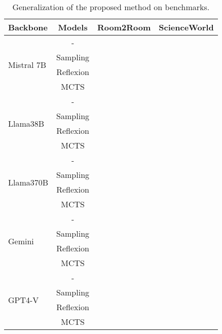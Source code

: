 \begin{table*}[t]
    \centering
    \begin{tabular}{lccc}
    \toprule
    Backbone    & Models & Room2Room & ScienceWorld \\
    \midrule
    \multirow{4}{*}{Mistral 7B}  & -      & \\
      & Sampling & \\
      & Reflexion & \\
      & MCTS \\
    \midrule
    \multirow{4}{*}{Llama38B}   & -      & \\
       & Sampling & \\
      & Reflexion & \\
      & MCTS \\
    \midrule
    \multirow{4}{*}{Llama370B}   & -      & \\
       & Sampling & \\
      & Reflexion & \\
      & MCTS \\
    \midrule
    \multirow{4}{*}{Gemini}   & -      & \\
       & Sampling & \\
      & Reflexion & \\
      & MCTS \\
    \midrule
    \multirow{4}{*}{GPT4-V}   & -      & \\
       & Sampling & \\
      & Reflexion & \\
      & MCTS \\
    \midrule
    \end{tabular}
    \caption{Generalization of the proposed method on benchmarks.}
    \label{tab:dataset_comparison}
\end{table*}